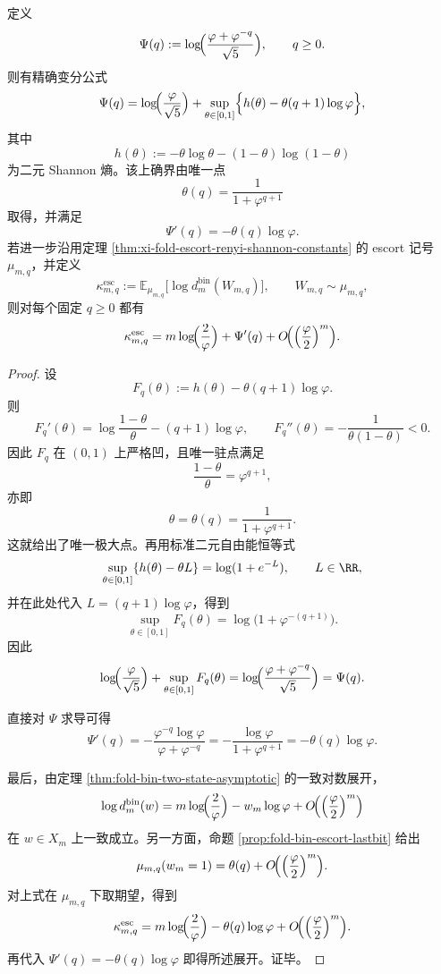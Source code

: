 \begin{theorem}\label{thm:xi-foldbin-two-phase-free-energy-variational}
定义
\[
\Psi(q):=\log\!\Bigl(\frac{\varphi+\varphi^{-q}}{\sqrt5}\Bigr),
\qquad
q\ge 0.
\]
则有精确变分公式
\[
\Psi(q)
=
\log\!\Bigl(\frac{\varphi}{\sqrt5}\Bigr)
+
\sup_{\theta\in[0,1]}
\Bigl\{
h(\theta)-\theta(q+1)\log\varphi
\Bigr\},
\]
其中
\[
h(\theta):=-\theta\log\theta-(1-\theta)\log(1-\theta)
\]
为二元 Shannon 熵。该上确界由唯一点
\[
\theta(q)=\frac{1}{1+\varphi^{q+1}}
\]
取得，并满足
\[
\Psi'(q)=-\theta(q)\log\varphi.
\]
若进一步沿用定理 \ref{thm:xi-fold-escort-renyi-shannon-constants} 的 escort 记号 \(\mu_{m,q}\)，并定义
\[
\kappa_{m,q}^{\mathrm{esc}}
:=
\mathbb E_{\mu_{m,q}}\!\bigl[\log d_m^{\mathrm{bin}}(W_{m,q})\bigr],
\qquad
W_{m,q}\sim \mu_{m,q},
\]
则对每个固定 \(q\ge 0\) 都有
\[
\kappa_{m,q}^{\mathrm{esc}}
=
m\log\!\Bigl(\frac{2}{\varphi}\Bigr)
+
\Psi'(q)
+
O\!\Bigl(\Bigl(\frac{\varphi}{2}\Bigr)^m\Bigr).
\]
\end{theorem}
\begin{proof}
设
\[
F_q(\theta):=h(\theta)-\theta(q+1)\log\varphi.
\]
则
\[
F_q'(\theta)=\log\frac{1-\theta}{\theta}-(q+1)\log\varphi,
\qquad
F_q''(\theta)=-\frac{1}{\theta(1-\theta)}<0.
\]
因此 \(F_q\) 在 \((0,1)\) 上严格凹，且唯一驻点满足
\[
\frac{1-\theta}{\theta}=\varphi^{q+1},
\]
亦即
\[
\theta=\theta(q)=\frac{1}{1+\varphi^{q+1}}.
\]
这就给出了唯一极大点。再用标准二元自由能恒等式
\[
\sup_{\theta\in[0,1]}\{h(\theta)-\theta L\}=\log(1+e^{-L}),
\qquad
L\in\RR,
\]
并在此处代入 \(L=(q+1)\log\varphi\)，得到
\[
\sup_{\theta\in[0,1]}F_q(\theta)
=
\log\bigl(1+\varphi^{-(q+1)}\bigr).
\]
因此
\[
\log\!\Bigl(\frac{\varphi}{\sqrt5}\Bigr)+\sup_{\theta\in[0,1]}F_q(\theta)
=
\log\!\Bigl(\frac{\varphi+\varphi^{-q}}{\sqrt5}\Bigr)
=
\Psi(q).
\]

直接对 \(\Psi\) 求导可得
\[
\Psi'(q)
=
-\frac{\varphi^{-q}\log\varphi}{\varphi+\varphi^{-q}}
=
-\frac{\log\varphi}{1+\varphi^{q+1}}
=
-\theta(q)\log\varphi.
\]

最后，由定理 \ref{thm:fold-bin-two-state-asymptotic} 的一致对数展开，
\[
\log d_m^{\mathrm{bin}}(w)
=
m\log\!\Bigl(\frac{2}{\varphi}\Bigr)
-w_m\log\varphi
+
O\!\Bigl(\Bigl(\frac{\varphi}{2}\Bigr)^m\Bigr)
\]
在 \(w\in X_m\) 上一致成立。另一方面，命题 \ref{prop:fold-bin-escort-lastbit} 给出
\[
\mu_{m,q}(w_m=1)=\theta(q)+O\!\Bigl(\Bigl(\frac{\varphi}{2}\Bigr)^m\Bigr).
\]
对上式在 \(\mu_{m,q}\) 下取期望，得到
\[
\kappa_{m,q}^{\mathrm{esc}}
=
m\log\!\Bigl(\frac{2}{\varphi}\Bigr)
-\theta(q)\log\varphi
+
O\!\Bigl(\Bigl(\frac{\varphi}{2}\Bigr)^m\Bigr).
\]
再代入 \(\Psi'(q)=-\theta(q)\log\varphi\) 即得所述展开。证毕。
\end{proof}

